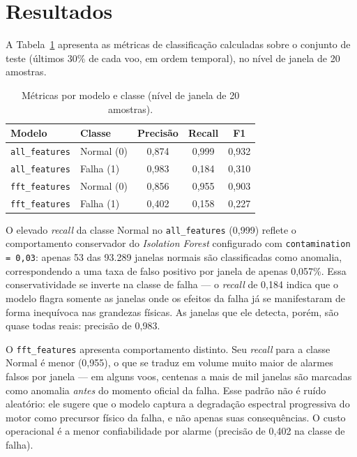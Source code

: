 \documentclass[12pt, a4paper]{article}
\begin{document}
\section{Resultados}

A Tabela~\ref{tab:metricas} apresenta as métricas de classificação calculadas sobre o conjunto de teste (últimos 30\% de cada voo, em ordem temporal), no nível de janela de 20 amostras.

\begin{table}[H]
  \centering
  \caption{Métricas por modelo e classe (nível de janela de 20 amostras).}
  \label{tab:metricas}
  \small
  \begin{tabular}{llccc}
    \toprule
    \textbf{Modelo} & \textbf{Classe} & \textbf{Precisão} & \textbf{Recall} & \textbf{F1} \\
    \midrule
    \rowcolor{azulhd}
    \texttt{all\_features} & Normal (0) & 0{,}874 & 0{,}999 & 0{,}932 \\
    \rowcolor{azulhd}
    \texttt{all\_features} & Falha  (1) & 0{,}983 & 0{,}184 & 0{,}310 \\
    \rowcolor{azulhd2}
    \texttt{fft\_features} & Normal (0) & 0{,}856 & 0{,}955 & 0{,}903 \\
    \rowcolor{azulhd2}
    \texttt{fft\_features} & Falha  (1) & 0{,}402 & 0{,}158 & 0{,}227 \\
    \bottomrule
  \end{tabular}
\end{table}

O elevado \textit{recall} da classe Normal no \texttt{all\_features} (0{,}999) reflete o comportamento conservador do \textit{Isolation Forest} configurado com \texttt{contamination\,=\,0{,}03}: apenas 53 das 93.289 janelas normais são classificadas como anomalia, correspondendo a uma taxa de falso positivo por janela de apenas 0{,}057\%. Essa conservatividade se inverte na classe de falha --- o \textit{recall} de 0{,}184 indica que o modelo flagra somente as janelas onde os efeitos da falha já se manifestaram de forma inequívoca nas grandezas físicas. As janelas que ele detecta, porém, são quase todas reais: precisão de 0{,}983.

O \texttt{fft\_features} apresenta comportamento distinto. Seu \textit{recall} para a classe Normal é menor (0{,}955), o que se traduz em volume muito maior de alarmes falsos por janela --- em alguns voos, centenas a mais de mil janelas são marcadas como anomalia \textit{antes} do momento oficial da falha. Esse padrão não é ruído aleatório: ele sugere que o modelo captura a degradação espectral progressiva do motor como precursor físico da falha, e não apenas suas consequências. O custo operacional é a menor confiabilidade por alarme (precisão de 0{,}402 na classe de falha).
\end{document}
